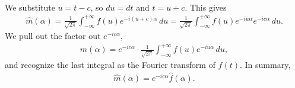 \documentclass[11pt]{article}
\begin{document}
\begin{solution}
\begin{itemize}
\begin{gather*}
\end{gather*}
We substitute \( u = t - c \), so \( du = dt \) and \( t = u + c \). This gives
\begin{gather*}
    {\hat m}(\alpha) 
    = 
    \frac{1}{\sqrt{2\pi}} \int_{-\infty}^{+\infty} f(u) e^{-i(u+c)\alpha} \, du
    =
    \frac{1}{\sqrt{2\pi}} \int_{-\infty}^{+\infty} f(u) e^{-iu\alpha} e^{-ic\alpha} \, du
    .
\end{gather*}
We pull out the factor out \( e^{-ic\alpha} \),
\begin{gather*}
    {\hat m}(\alpha) = e^{-ic\alpha} \cdot \frac{1}{\sqrt{2\pi}} \int_{-\infty}^{+\infty} f(u) e^{-iu\alpha} \, du,
\end{gather*}
and recognize the last integral as the Fourier transform of \( f(t) \). In summary, 
\begin{gather*}
    {\hat m}(\alpha) = e^{-ic\alpha} {\hat f}(\alpha).
\end{gather*}
\end{itemize}
\end{solution}
\end{document}
